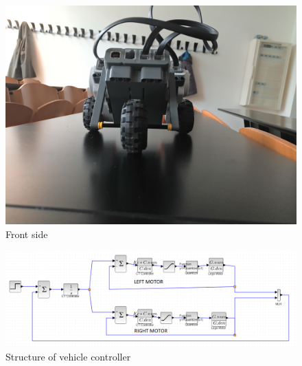 \documentclass[a4paper,12pt,oneside]{article}
\begin{document}
\begin{figure}
	\centering
	\includegraphics[width=\columnwidth]{nxtImages/3.jpg}
	\caption{Front side}
	\label{fig:front}
\end{figure}
\begin{figure}
	\centering
	\includegraphics[width=\columnwidth]{vehicle.png}
	\caption{Structure of vehicle controller}
	\label{fig:diagram}
\end{figure}
\end{document}
